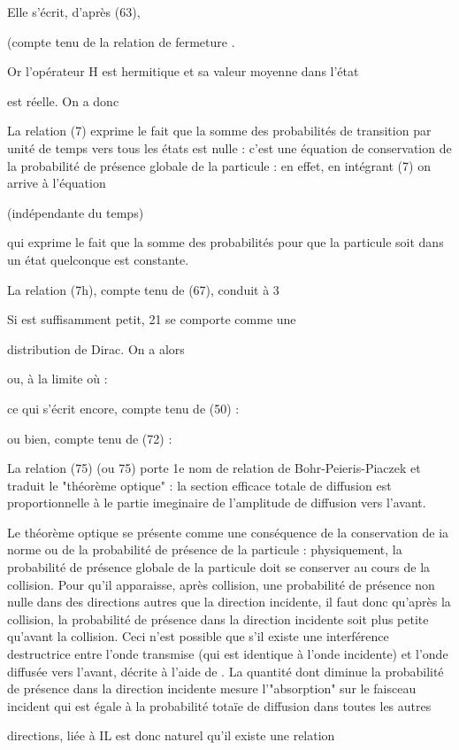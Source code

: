 Elle s'écrit, d'après (63),

(compte tenu de la relation de fermeture .

Or l'opérateur H est hermitique et sa valeur moyenne dans l'état 

est réelle. On a donc

La relation (7) exprime le fait que la somme des probabilités
de transition par unité de temps vers tous les états  est nulle :
c'est une équation de conservation de la probabilité de présence globale
de la particule : en effet, en intégrant (7) on arrive à l'équation

 (indépendante du temps)

qui exprime le fait que la somme des probabilités pour que la particule
soit dans un état  quelconque est constante.

La relation (7h), compte tenu de (67), conduit à 3

Si  est suffisamment petit, 21 se comporte comme une

distribution de Dirac. On a alors


ou, à la limite où  :

ce qui s'écrit encore, compte tenu de (50) :

ou bien, compte tenu de (72) :

La relation (75) (ou 75) porte 1e nom de relation de
Bohr-Peieris-Piaczek et traduit le "théorème optique" : la section
efficace totale de diffusion est proportionnelle à le partie imeginaire de
l'amplitude de diffusion vers l'avant.

Le théorème optique se présente comme une conséquence
de la conservation de ia norme ou de la probabilité de présence de la
particule : physiquement, la probabilité de présence globale de la particule
doit se conserver au cours de la collision. Pour qu'il apparaisse,
après collision, une probabilité de présence non nulle dans des directions
autres que la direction incidente, il faut donc qu'après la collision, la
probabilité de présence dans la direction incidente soit plus petite
qu'avant la collision. Ceci n'est possible que s'il existe une interférence
destructrice entre l'onde transmise (qui est identique à l'onde
incidente) et l'onde diffusée vers l'avant, décrite à l'aide de
. La quantité dont diminue la probabilité de présence dans la
direction incidente mesure l'"absorption" sur le faisceau incident qui
est égale à la probabilité totaïe de diffusion dans toutes les autres

directions, liée à  IL est donc naturel qu'il existe une relation

